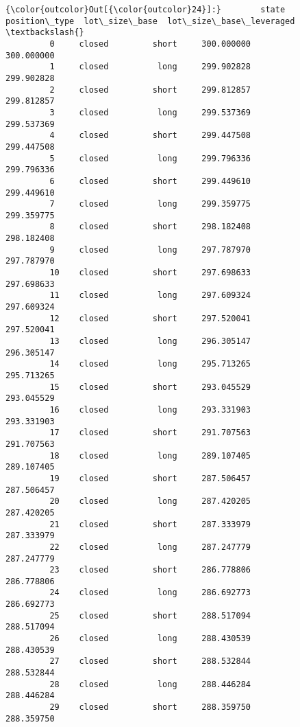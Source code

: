 \documentclass[11pt]{article}
\begin{document}
\begin{Verbatim}[commandchars=\\\{\}]
{\color{outcolor}Out[{\color{outcolor}24}]:}        state position\_type  lot\_size\_base  lot\_size\_base\_leveraged  \textbackslash{}
         0     closed         short     300.000000               300.000000   
         1     closed          long     299.902828               299.902828   
         2     closed         short     299.812857               299.812857   
         3     closed          long     299.537369               299.537369   
         4     closed         short     299.447508               299.447508   
         5     closed          long     299.796336               299.796336   
         6     closed         short     299.449610               299.449610   
         7     closed          long     299.359775               299.359775   
         8     closed         short     298.182408               298.182408   
         9     closed          long     297.787970               297.787970   
         10    closed         short     297.698633               297.698633   
         11    closed          long     297.609324               297.609324   
         12    closed         short     297.520041               297.520041   
         13    closed          long     296.305147               296.305147   
         14    closed          long     295.713265               295.713265   
         15    closed         short     293.045529               293.045529   
         16    closed          long     293.331903               293.331903   
         17    closed         short     291.707563               291.707563   
         18    closed          long     289.107405               289.107405   
         19    closed         short     287.506457               287.506457   
         20    closed          long     287.420205               287.420205   
         21    closed         short     287.333979               287.333979   
         22    closed          long     287.247779               287.247779   
         23    closed         short     286.778806               286.778806   
         24    closed          long     286.692773               286.692773   
         25    closed         short     288.517094               288.517094   
         26    closed          long     288.430539               288.430539   
         27    closed         short     288.532844               288.532844   
         28    closed          long     288.446284               288.446284   
         29    closed         short     288.359750               288.359750   

\end{Verbatim}
\end{document}
